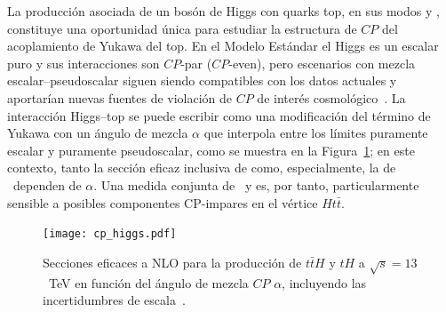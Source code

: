 La producción asociada de un bosón de Higgs con quarks top, en sus modos \ttH y \thqb, constituye una oportunidad única para estudiar la estructura de $CP$ del acoplamiento de Yukawa del top. En el Modelo Estándar el Higgs es un escalar puro y sus interacciones son $CP$-par ($CP$-even), pero escenarios con mezcla escalar–pseudoscalar siguen siendo compatibles con los datos actuales y aportarían nuevas fuentes de violación de $CP$ de interés cosmológico~\cite{Gunion:1996xu, Ellis:2013yxa, He:2015spx, Boudjema:2015nda}. 
La interacción Higgs–top se puede escribir como una modificación del término de Yukawa con un ángulo de mezcla $\alpha$ que interpola entre los límites puramente escalar y puramente pseudoscalar, como se muestra en la Figura~\ref{res:th_cp_dependence}; en este contexto, tanto la sección eficaz inclusiva de \ttH como, especialmente, la de \tH\ dependen de $\alpha$. Una medida conjunta de \ttH\ y \thqb es, por tanto, particularmente sensible a posibles componentes CP-impares en el vértice $Ht\bar t$.

\begin{figure}[htbp]
  \centering
  \texttt{[image: cp\_higgs.pdf]}
  \caption{Secciones eficaces a NLO para la producción de $t\bar{t}H$ y $tH$ a $\sqrt{s}=13$~TeV en función del ángulo de mezcla $CP$ $\alpha$, incluyendo las incertidumbres de escala~\cite{demartin2015}.}
  \label{res:th_cp_dependence}
\end{figure}

